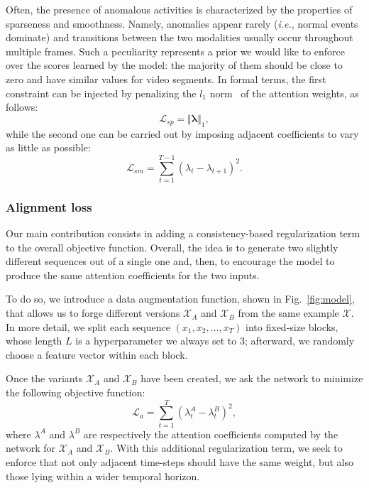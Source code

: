 \documentclass[runningheads]{llncs}
\begin{document}
Often, the presence of anomalous activities is characterized by the properties of sparseness and smoothness. Namely, anomalies appear rarely (\textit{i.e.}, normal events dominate) and transitions between the two modalities usually occur throughout multiple frames. Such a peculiarity represents a prior we would like to enforce over the scores learned by the model: the majority of them should be close to zero and have similar values for video segments. In formal terms, the first constraint can be injected by penalizing the $l_1$ norm~\cite{cascianelli2021data} of the attention weights, as follows:
\begin{equation}
    \mathcal{L}_{sp} = \Vert \mathbf{\lambda} \Vert_1,
\end{equation}
while the second one can be carried out by imposing adjacent coefficients to vary as little as possible:
\begin{equation}
    \mathcal{L}_{sm} = \sum_{t=1}^{T-1} (\lambda_t - \lambda_{t+1})^2.
\end{equation}
\subsubsection{Alignment loss} Our main contribution consists in adding a consistency-based regularization term to the overall objective function. Overall, the idea is to generate two slightly different sequences out of a single one and, then, to encourage the model to produce the same attention coefficients for the two inputs.

To do so, we introduce a data augmentation function, shown in Fig.~\ref{fig:model}, that allows us to forge different versions $\mathcal{X}_A$ and $\mathcal{X}_B$ from the same example $\mathcal{X}$. In more detail, we split each sequence $(x_1, x_2, \dots, x_T)$ into fixed-size blocks, whose length $L$ is a hyperparameter we always set to $3$; afterward, we randomly choose a feature vector within each block.

Once the variants $\mathcal{X}_A$ and $\mathcal{X}_B$ have been created, we ask the network to minimize the following objective function:
\begin{equation}
    \mathcal{L}_{a} = \sum_{t=1}^{T} (\lambda^A_t - \lambda^B_{t})^2,
\end{equation}
where $\lambda^A$ and $\lambda^B$ are respectively the attention coefficients computed by the network for $\mathcal{X}_A$ and $\mathcal{X}_B$. With this additional regularization term, we seek to enforce that not only adjacent time-steps should have the same weight, but also those lying within a wider temporal horizon. 
\end{document}
